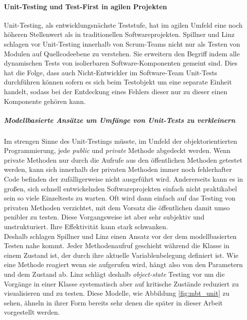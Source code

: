 \paragraph{Unit-Testing und Test-First in agilen Projekten}   
Unit-Testing, als entwicklungsnächste Teststufe, hat im agilen Umfeld eine noch höheren Stellenwert als in traditionellen Softwareprojekten. Spillner und Linz\cite{spillner_software_2014} schlagen vor Unit-Testing innerhalb von Scrum-Teams nicht nur als Testen von Modulen auf Quellcodeebene zu verstehen. Sie erweitern den Begriff indem alle dynamischen Tests von isolierbaren Software-Komponenten gemeint sind. Dies hat die Folge, dass auch Nicht-Entwickler im Software-Team Unit-Tests durchführen können sofern es sich beim Testobjekt um eine separate Einheit handelt, sodass bei der Entdeckung eines Fehlers dieser nur zu dieser einen Komponente gehören kann.\\

\subparagraph{Modellbasierte Ansätze um Umfänge von Unit-Tests zu verkleinern}
Im strengen Sinne des Unit-Testings müsste, im Umfeld der objektorientierten Programmierung, jede \textit{public} und \textit{private} Methode abgedeckt werden. Wenn private Methoden nur durch die Aufrufe aus den öffentlichen Methoden getestet werden, kann sich innerhalb der privaten Methoden immer noch fehlerhafter Code befinden der zufälligerweise nicht ausgeführt wird. Andererseits kann es in großen, sich schnell entwickelnden Softwareprojekten einfach nicht praktikabel sein so viele Einzeltests zu warten. Oft wird dann einfach auf das Testing von privaten Methoden verzichtet, mit dem Vorsatz die öffentlichen damit umso penibler zu testen. Diese Vorgangsweise ist aber sehr subjektiv und unstrukturiert. Ihre Effektivität kann stark schwanken.\\
Deshalb schlagen Spillner und Linz einen Ansatz vor der dem modellbasierten Testen nahe kommt. Jeder Methodenaufruf geschieht während die Klasse in einem Zustand ist, der durch ihre aktuelle Variablenbelegung definiert ist. Wie eine Methode reagiert wenn sie aufgerufen wird, hängt also von den Parametern und dem Zustand ab. Linz schlägt deshalb \textit{object-state} Testing vor um die Vorgänge in einer Klasse systematisch aber auf kritische Zustände reduziert zu visualisieren und zu testen. Diese Modelle, wie Abbildung \ref{fig:mbt_unit} zu sehen, ähneln in ihrer Form bereits sehr denen die später in dieser Arbeit vorgestellt werden.

